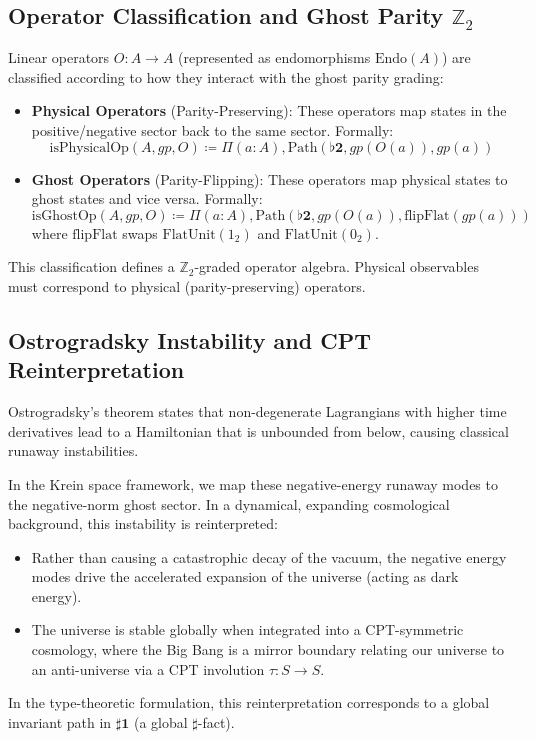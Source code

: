 \documentclass{article}
\begin{document}
\subsection{Operator Classification and Ghost Parity $\mathbb{Z}_2$}
\label{sec:operators}

Linear operators $O : A \to A$ (represented as endomorphisms $\text{Endo}(A)$) are classified according to how they interact with the ghost parity grading:
\begin{itemize}
    \item \textbf{Physical Operators} (Parity-Preserving): These operators map states in the positive/negative sector back to the same sector. Formally:
    \begin{equation}
        \text{isPhysicalOp}(A, gp, O) \coloneqq \Pi(a:A), \text{Path}(\flat\mathbf{2}, gp(O(a)), gp(a))
    \end{equation}
    \item \textbf{Ghost Operators} (Parity-Flipping): These operators map physical states to ghost states and vice versa. Formally:
    \begin{equation}
        \text{isGhostOp}(A, gp, O) \coloneqq \Pi(a:A), \text{Path}(\flat\mathbf{2}, gp(O(a)), \text{flipFlat}(gp(a)))
    \end{equation}
    where $\text{flipFlat}$ swaps $\text{FlatUnit}(1_2)$ and $\text{FlatUnit}(0_2)$.
\end{itemize}
This classification defines a $\mathbb{Z}_2$-graded operator algebra. Physical observables must correspond to physical (parity-preserving) operators.

\subsection{Ostrogradsky Instability and CPT Reinterpretation}
\label{sec:ostrogradsky}

Ostrogradsky's theorem states that non-degenerate Lagrangians with higher time derivatives lead to a Hamiltonian that is unbounded from below, causing classical runaway instabilities.

In the Krein space framework, we map these negative-energy runaway modes to the negative-norm ghost sector.
In a dynamical, expanding cosmological background, this instability is reinterpreted:
\begin{itemize}
    \item Rather than causing a catastrophic decay of the vacuum, the negative energy modes drive the accelerated expansion of the universe (acting as dark energy).
    \item The universe is stable globally when integrated into a CPT-symmetric cosmology, where the Big Bang is a mirror boundary relating our universe to an anti-universe via a CPT involution $\tau : S \to S$.
\end{itemize}
In the type-theoretic formulation, this reinterpretation corresponds to a global invariant path in $\sharp \mathbf{1}$ (a global $\sharp$-fact).
\end{document}
